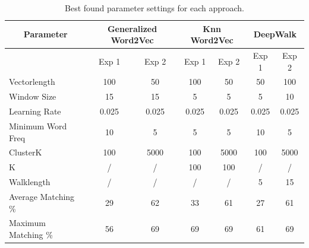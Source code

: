 \begin{table}[!htb]
\centering
\begin{tabular}{ccccccc}
\hline
Parameter                                   & \multicolumn{2}{c}{Generalized Word2Vec}         & \multicolumn{2}{c}{Knn Word2Vec}                 & \multicolumn{2}{c}{DeepWalk} \\ \hline
\multicolumn{1}{l|}{}                       & Exp 1 & \multicolumn{1}{c|}{Exp 2} & Exp 1 & \multicolumn{1}{c|}{Exp 2} & Exp 1  & Exp 2 \\ \hline
\multicolumn{1}{l|}{Vectorlength}           & 100          & \multicolumn{1}{c|}{50}           & 100          & \multicolumn{1}{c|}{50}           & 50            & 100          \\
\multicolumn{1}{l|}{Window Size}            & 15           & \multicolumn{1}{c|}{15}           & 5            & \multicolumn{1}{c|}{5}            & 5             & 10           \\
\multicolumn{1}{l|}{Learning Rate}          & 0.025        & \multicolumn{1}{c|}{0.025}        & 0.025        & \multicolumn{1}{c|}{0.025}        & 0.025         & 0.025        \\
\multicolumn{1}{l|}{Minimum Word Freq} & 10           & \multicolumn{1}{c|}{5}            & 5            & \multicolumn{1}{c|}{5}            & 10            & 5            \\
\multicolumn{1}{l|}{ClusterK}               & 100          & \multicolumn{1}{c|}{5000}         & 100          & \multicolumn{1}{c|}{5000}         & 100           & 5000         \\
\multicolumn{1}{l|}{K}                      & /            & \multicolumn{1}{c|}{/}            & 100          & \multicolumn{1}{c|}{100}          & /             & /            \\ 
\multicolumn{1}{l|}{Walklength}             & /            & \multicolumn{1}{c|}{/}            & /            & \multicolumn{1}{c|}{/}            & 5             & 15           \\ \hline
\multicolumn{1}{l|}{Average Matching \%}    & 29           & \multicolumn{1}{c|}{62}           & 33           & \multicolumn{1}{c|}{61}           & 27            & 61           \\
\multicolumn{1}{l|}{Maximum Matching \%}    & 56           & \multicolumn{1}{c|}{69}           & 69           & \multicolumn{1}{c|}{69}           & 61            & 69          
\end{tabular}

\caption{Best found parameter settings for each approach.}
\label{tab:approaches}
\end{table}

